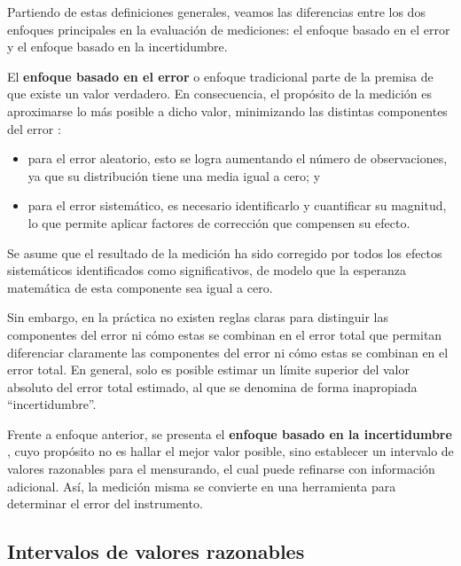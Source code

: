 Partiendo de estas definiciones generales, veamos las diferencias entre los dos enfoques principales en la 
evaluación de mediciones: el enfoque basado en el error y el enfoque basado en la incertidumbre.

El \textbf{enfoque basado en el error} o enfoque tradicional parte de la premisa de que existe un valor 
verdadero. En consecuencia, el propósito de la medición es aproximarse lo más posible a dicho valor, 
minimizando las distintas componentes del error \cite{jcgm100:2008}:

\begin{itemize}
    \item para el error aleatorio, esto se logra aumentando el número de observaciones, ya que su distribución 
    tiene una media igual a cero; y

    \item para el error sistemático, es necesario identificarlo y cuantificar su magnitud, lo que permite 
    aplicar factores de corrección que compensen su efecto.

\end{itemize}

Se asume que el resultado de la medición ha sido corregido por todos los efectos sistemáticos identificados
como significativos, de modelo que la esperanza matemática de esta componente sea igual a cero.

Sin embargo, en la práctica no existen reglas claras para distinguir las componentes del error ni cómo estas 
se combinan en el error total
 que permitan diferenciar claramente las componentes del error ni
cómo estas se combinan en el error total. En general, solo es posible estimar un límite superior del valor 
absoluto del error total estimado, al que se denomina de forma inapropiada ``incertidumbre''. 

Frente a enfoque anterior, se presenta el \textbf{enfoque basado en la incertidumbre} \cite{jcgm100:2008}, 
cuyo propósito no es hallar el mejor valor posible, sino establecer un intervalo de valores razonables para el 
mensurando, el cual puede refinarse con información adicional. Así, la medición misma se convierte en una 
herramienta para determinar el error del instrumento. 


\subsection{Intervalos de valores razonables}

